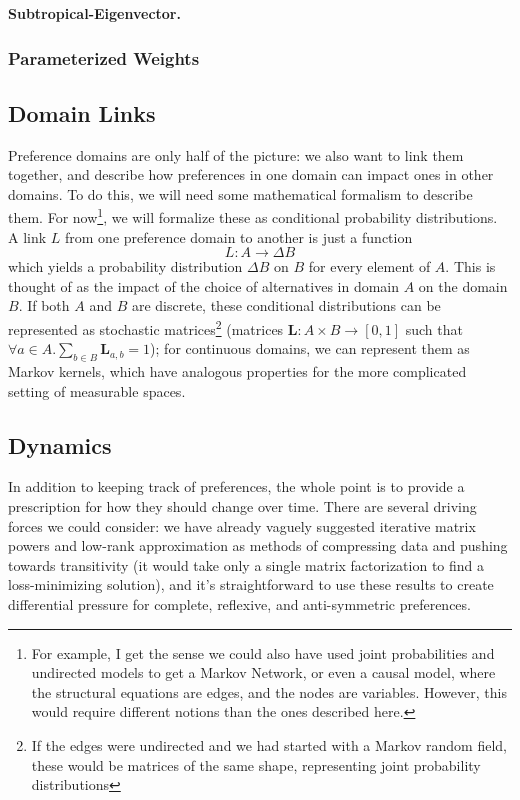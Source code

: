 \documentclass{article}
\theoremstyle{plain}
\theoremstyle{definition}
\theoremstyle{remark}
\newcommand\mat[1]{\mathbf #1}
\begin{document}
	\textbf{Subtropical-Eigenvector.} \cite{elsner2004max}\cite{elsner2010max}
	
	\subsubsection{Parameterized Weights}
	
	\subsection{Domain Links}
	Preference domains are only half of the picture: we also want to link them together, and describe how preferences in one domain can impact ones in other domains. To do this, we will need some mathematical formalism to describe them. For now\footnote{For example, I get the sense we could also have used joint probabilities and undirected models to get a Markov Network, or even a causal model, where the structural equations are edges, and the nodes are variables. However, this would require different notions than the ones described here.}, we will formalize these as conditional probability distributions. A link $L$ from one preference domain to another is just a function 
	\[ L : A \to \Delta B \]
	which yields a probability distribution $\Delta B$ on $B$ for every element of $A$. This is thought of as the impact of the choice of alternatives in domain $A$ on the domain $B$. If both $A$ and $B$ are discrete, these conditional distributions can be represented as stochastic matrices\footnote{If the edges were undirected and we had started with a Markov random field, these would be matrices of the same shape, representing joint probability distributions} (matrices $\mat L : A \times B \to [0,1]$ such that $\forall a \in A. \sum_{b \in B} \mat L_{a, b} = 1$); for continuous domains, we can represent them as Markov kernels, which have analogous properties for the more complicated setting of measurable spaces.
	
	\subsection{Dynamics}
	In addition to keeping track of preferences, the whole point is to provide a prescription for how they should change over time. There are several driving forces we could consider: we have already vaguely suggested iterative matrix powers and low-rank approximation as methods of compressing data and pushing towards transitivity (it would take only a single matrix factorization to find a loss-minimizing solution), and it's straightforward to use these results to create differential pressure for complete, reflexive, and anti-symmetric preferences. 
	
\end{document}
